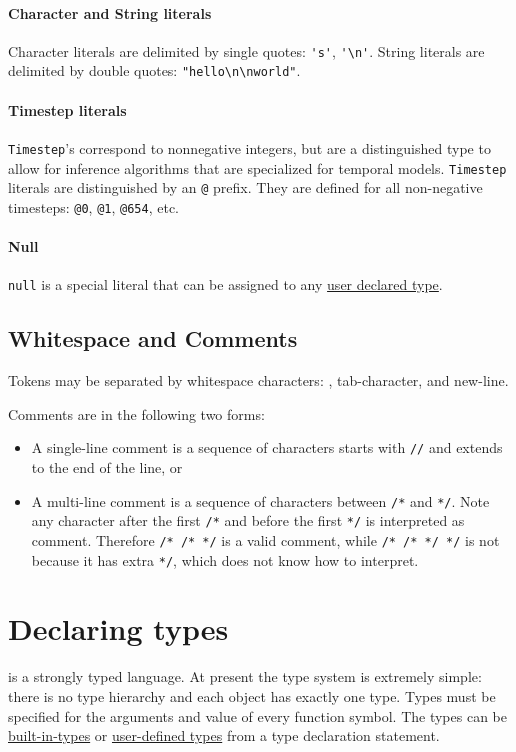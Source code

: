 \documentclass[12pt]{article}
\begin{document}
\paragraph{Character and String literals}
Character literals are delimited by single quotes: \verb|'s'|, \verb|'\n'|.
String literals are delimited by double quotes: \verb|"hello\n\nworld"|.

\paragraph{Timestep literals}
\verb|Timestep|'s correspond to nonnegative integers, but are a distinguished type
to allow for inference algorithms that are specialized for temporal models. 
\verb|Timestep| literals are distinguished by an \verb|@| prefix. They are defined for all non-negative timesteps: \verb|@0|, \verb|@1|, \verb|@654|, etc.

\paragraph{Null}
\verb|null| is a special literal that can be assigned to any \hyperref[type-declaration-section]{user declared type}. 

\subsection{Whitespace and Comments}
Tokens may be separated by whitespace characters: \textvisiblespace, tab-character, and new-line. 

Comments are in the following two forms:
\begin{itemize}
\item A single-line comment is a sequence of characters starts with \verb|//| and extends to the end of the line, or
\item A multi-line comment is a sequence of characters between \verb|/*| and \verb|*/|. Note any character after the first \verb|/*| and before the first \verb|*/| is interpreted as comment. Therefore \verb|/* /* */| is a valid comment, while \verb|/* /* */ */| is not because it has extra \verb|*/|, which \bl does not know how to interpret.
\end{itemize}

\section{Declaring types}\label{type-declaration-section}
\bl is a strongly typed language. At present the type system is extremely simple: there is no type hierarchy
and each object has exactly one type. Types must be specified for the arguments and value of every function symbol.
The types can be \hyperref[builtin-type-section]{built-in-types} or \hyperref[user-type-section]{user-defined types} from a type declaration statement.
\end{document}
